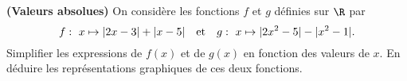 
\begin{exercice}  \;
\textbf{(Valeurs absolues)}
On consid\`ere les fonctions $f$ et $g$ d\'efinies sur $\R$ par
$$f:\ x\mapsto |2x-3|+|x-5|\quad \hbox{et}\quad g:\ x\mapsto |2x^2-5|-|x^2-1|.$$
Simplifier les expressions de $f(x)$ et de $g(x)$ en fonction des valeurs de $x$. En d\'eduire les repr\'esentations graphiques de ces deux fonctions.
\end{exercice}